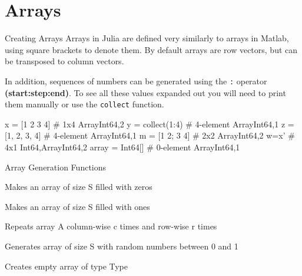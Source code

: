 \documentclass{beamer}
\newenvironment{Boxx}{\begin{tcolorbox}[standard jigsaw, opacityframe=0.8, opacityback=0.0,left=2pt,right=2pt,top=0pt,bottom=0pt]}{\end{tcolorbox}}
\begin{document}
\section{Arrays}
\begin{frame}[fragile]{Creating Arrays}
	Arrays in Julia are defined very similarly to arrays in Matlab, using square brackets to denote them. By default arrays are row vectors, but can be transposed to column vectors.
\pause

	In addition, sequences of numbers can be generated using the \verb|:| operator \textbf{(start:step:end)}. To see all these values expanded out you will need to print them manually or use the \verb|collect| function. 

\pause
  \begin{Boxx}
  \begin{jllisting}
  	x = [1 2 3 4] 			# 1x4 Array{Int64,2}
	y = collect(1:4) 		# 4-element Array{Int64,1}
	z = [1, 2, 3, 4] 		# 4-element Array{Int64,1}
	m = [1 2; 3 4]			# 2x2 Array{Int64,2}
	w=x'						# 4x1 {Int64,Array{Int64,2}}
	array = Int64[]		# 0-element Array{Int64,1}
	\end{jllisting}
  \end{Boxx}
	

	\pause
	\vspace*{-0.15cm}
	
\end{frame}

\begin{frame}[fragile]{Array Generation Functions}
	\begin{description}[leftmargin=*]
		\item[zeros(S)] Makes an array of size S filled with zeros  
		\item[ones(S)]  Makes an array of size S filled with ones 
		\item[repeat(A,c,r)] Repeats array A column-wise c times and row-wise r times
		\item[rand(S)] Generates array of size S with random numbers between 0 and 1
		\item[Type\textbf{[]}] Creates empty array of type Type
	\end{description}
	
\end{frame}
\end{document}
